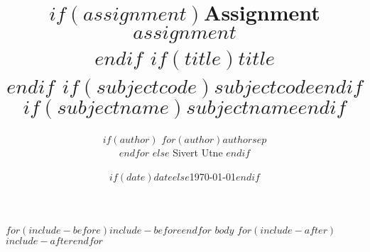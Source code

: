\documentclass[]{$documentclass$}
\title{
    $if(assignment)${\color{Gray}\large Assignment $assignment$\\\vspace{-2mm}}$endif$
    $if(title)$\textbf{$title$}\\\vspace{-2mm}$endif$
    {\color{Gray}\normalsize $if(subjectcode)$$subjectcode$$endif$ $if(subjectname)$$subjectname$$endif$}
}
\author{
$if(author)$
    $for(author)$$author$$sep$ \\ $endfor$
$else$
    Sivert Utne
$endif$
}
\date{$if(date)$$date$$else$\today$endif$}
\begin{document}
    \maketitle

    \vfill
    \tableofcontents 
    \thispagestyle{empty}

    $for(include-before)$$include-before$$endfor$
    \clearpage
    \renewcommand{\arraystretch}{1.3}
    \setcounter{page}{1}
    $body$ %
    $for(include-after)$$include-after$$endfor$
\end{document}
